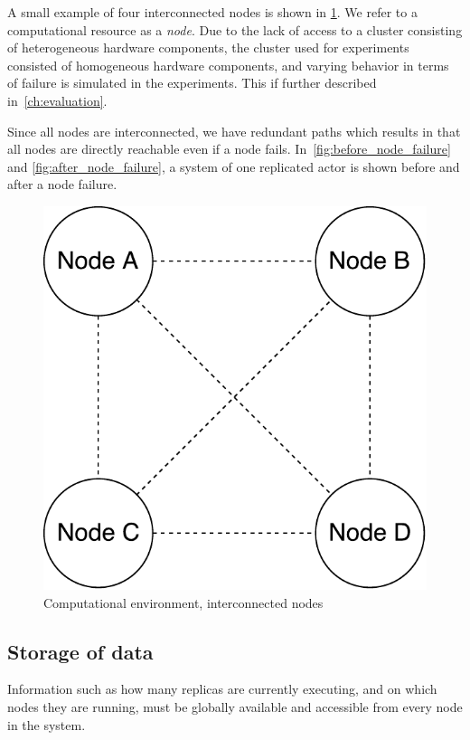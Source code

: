 \documentclass{cslthse-msc}
\begin{document}
A small example of four interconnected nodes is shown in \cref{fig:computational_environment}. We refer to a computational resource as a \emph{node}. Due to the lack of access to a cluster consisting of heterogeneous hardware components, the cluster used for experiments consisted of homogeneous hardware components, and varying behavior in terms of failure is simulated in the experiments. This if further described in~\cref{ch:evaluation}.

Since all nodes are interconnected, we have redundant paths which results in that all nodes are directly reachable even if a node fails. In~\cref{fig:before_node_failure} and \cref{fig:after_node_failure}, a system of one replicated actor is shown before and after a node failure.

\begin{figure}[!hbt]
\centering
\includegraphics[scale=0.5]{images/computational_environment.pdf}
\caption[Computational environment]{Computational environment, interconnected nodes} \label{fig:computational_environment}
\end{figure}

\subsection{Storage of data} \label{subsec:design_storage}
Information such as how many replicas are currently executing, and on which nodes they are running, must be globally available and accessible from every node in the system.
\end{document}
